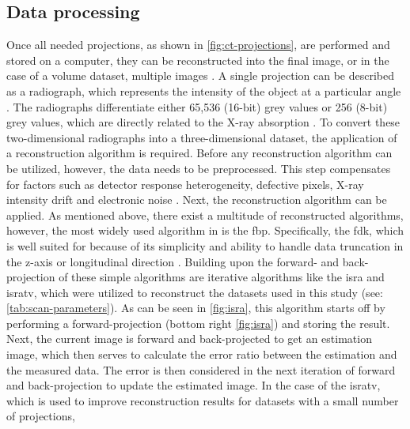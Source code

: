 \subsection{Data processing}\label{s:b-mct-processing}
Once all needed projections, as shown in \cref{fig:ct-projections}, are performed and stored on a computer, they can be reconstructed into the final image, or in the case of a volume dataset, multiple images \cite{liMicrocomputedTomographySmall2008,orhanMicrocomputedTomographyMicroCT2020}.
A single projection can be described as a radiograph, which represents the intensity of the object at a particular angle \cite{liMicrocomputedTomographySmall2008,orhanMicrocomputedTomographyMicroCT2020}.
The radiographs differentiate either 65,536 (16-\gls{bit}) grey values or 256 (8-\gls{bit}) grey values, which are directly related to the X-ray absorption \cite{liMicrocomputedTomographySmall2008,orhanMicrocomputedTomographyMicroCT2020}.
To convert these two-dimensional radiographs into a three-dimensional dataset, the application of a reconstruction algorithm is required.
Before any reconstruction algorithm can be utilized, however, the data needs to be preprocessed.
This step compensates for factors such as detector response heterogeneity, defective pixels, X-ray intensity drift and electronic noise \cite{liMicrocomputedTomographySmall2008}.
Next, the reconstruction algorithm can be applied.
As mentioned above, there exist a multitude of reconstructed algorithms, however,
the most widely used algorithm in \mct\space is the \acrfull{fbp}.
Specifically, the \acrfull{fdk}, which is well suited for \mct\space because of its simplicity
and ability to handle data truncation in the z-axis or longitudinal direction \cite{liMicrocomputedTomographySmall2008,orhanMicrocomputedTomographyMicroCT2020}.
Building upon the forward- and back-projection of these simple algorithms are iterative algorithms like the \gls{isra} and \gls{isratv},
which were utilized to reconstruct the datasets used in this study (see: \cref{tab:scan-parameters}).
As can be seen in \cref{fig:isra}, this algorithm starts off by performing a forward-projection (bottom right \cref{fig:isra}) and storing the result.
Next, the current image is forward and back-projected to get an estimation image,
which then serves to calculate the error ratio between the estimation and the measured data.
The error is then considered in the next iteration of forward and back-projection to update the estimated image.
In the case of the \gls{isratv}, which is used to improve reconstruction results for datasets with a small number of projections,
